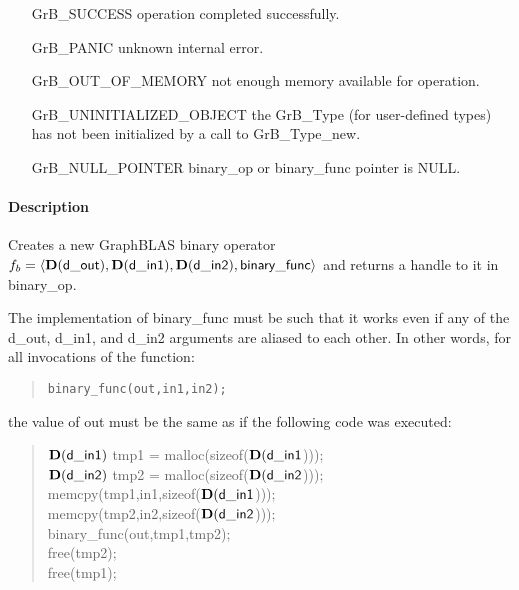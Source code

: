 \begin{itemize}[leftmargin=2.1in]
\item[{\sf GrB\_SUCCESS}]           operation completed successfully.
\item[{\sf GrB\_PANIC}]             unknown internal error.
\item[{\sf GrB\_OUT\_OF\_MEMORY}]          not enough memory available for operation.
\item[{\sf GrB\_UNINITIALIZED\_OBJECT}]          the {\sf GrB\_Type} (for user-defined types)
                                    has not been initialized by a call to {\sf GrB\_Type\_new}.
\item[{\sf GrB\_NULL\_POINTER}]    {\sf binary\_op} or {\sf binary\_func} pointer is {\sf NULL}.

\end{itemize}

\paragraph{Description}

Creates a new GraphBLAS binary operator $f_b = \langle \mathbf{D}({\sf d\_out}), 
\mathbf{D}({\sf d\_in1}), \mathbf{D}({\sf d\_in2}), {\sf binary\_func} \rangle$ and
returns a handle to it in {\sf binary\_op}.

The implementation of {\sf binary\_func} must be such that it works
even if any of the {\sf d\_out}, {\sf d\_in1}, and {\sf d\_in2} arguments are aliased to each other.
In other words, for all invocations of the function:
\begin{quote}
\begin{verbatim}
binary_func(out,in1,in2);
\end{verbatim}
\end{quote}
the value of {\sf out} must be the same as if the following code
was executed:

\begin{quote}
\begin{code}
    $\mathbf{D}({\sf d\_in1})$ tmp1 = malloc(sizeof($\mathbf{D}({\sf d\_in1}$))); \\
    $\mathbf{D}({\sf d\_in2})$ tmp2 = malloc(sizeof($\mathbf{D}({\sf d\_in2}$))); \\
    memcpy(tmp1,in1,sizeof($\mathbf{D}({\sf d\_in1}$))); \\
    memcpy(tmp2,in2,sizeof($\mathbf{D}({\sf d\_in2}$))); \\
    binary\_func(out,tmp1,tmp2); \\
    free(tmp2); \\
    free(tmp1);
\end{code}
\end{quote}

